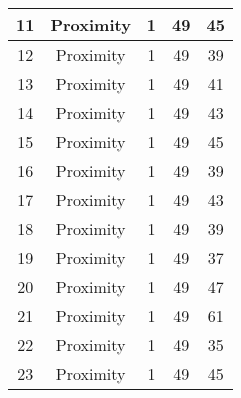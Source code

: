 \documentclass[results.tex]{subfiles}
\begin{document}
\begin{center}
\begin{tabular}{| c || c | c | c | c |}
            \hline
            11                      & Proximity                    & 1                      & 49                      & 45                   \\
            \hline
            12                      & Proximity                    & 1                      & 49                      & 39                   \\
            \hline
            13                      & Proximity                    & 1                      & 49                      & 41                   \\
            \hline
            14                      & Proximity                    & 1                      & 49                      & 43                   \\
            \hline
            15                      & Proximity                    & 1                      & 49                      & 45                   \\
            \hline
            16                      & Proximity                    & 1                      & 49                      & 39                   \\
            \hline
            17                      & Proximity                    & 1                      & 49                      & 43                   \\
            \hline
            18                      & Proximity                    & 1                      & 49                      & 39                   \\
            \hline
            19                      & Proximity                    & 1                      & 49                      & 37                   \\
            \hline
            20                      & Proximity                    & 1                      & 49                      & 47                   \\
            \hline
            21                      & Proximity                    & 1                      & 49                      & 61                   \\
            \hline
            22                      & Proximity                    & 1                      & 49                      & 35                   \\
            \hline
            23                      & Proximity                    & 1                      & 49                      & 45                   \\

\end{tabular}
\end{center}
\end{document}
